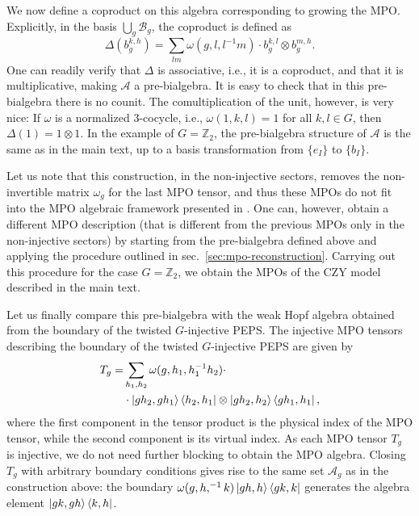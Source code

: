 \documentclass[prx, twocolumn, superscriptaddress, dvipsnames]{revtex4-2}
\theoremstyle{definition}
\newcommand{\mA}{\mathcal{A}}
\begin{document}
We now define a coproduct on this algebra corresponding to growing the MPO. Explicitly, in the basis $\bigcup_g\mathcal{B}_g$, the coproduct is defined as
\begin{equation}
    \Delta(b_g^{k,h}) = \sum_{lm} \omega(g,l,l^{-1}m) \cdot b_g^{k,l} \otimes b_g^{m,h}.
\end{equation}
One can readily verify that $\Delta$ is associative, i.e., it is a coproduct, and that it is multiplicative, making $\mathcal{A}$ a pre-bialgebra. It is easy to check that in this pre-bialgebra there is no counit. The comultiplication of the unit, however, is very nice: If $\omega$ is a normalized 3-cocycle, i.e., $\omega(1,k,l) = 1$ for all $k,l\in G$, then $\Delta(1) = 1\otimes 1$. In the example of $G=\mathbb{Z}_2$, the pre-bialgebra structure of $\mA$ is the same as in the main text, up to a basis transformation from $\{e_I\}$ to $\{b_I\}$. 

Let us note that this construction, in the non-injective sectors, removes the non-invertible matrix $\omega_g$ for the last MPO tensor, and thus these MPOs do not fit into the MPO algebraic framework presented in \cite{molnar2022matrix}. One can, however, obtain a different MPO description (that is different from the previous MPOs only in the non-injective sectors) by starting from the pre-bialgebra defined above and applying the procedure outlined in sec.~\ref{sec:mpo-reconstruction}. Carrying out this procedure for the case $G=\mathbb{Z}_2$, we obtain the MPOs of the CZY model described in the main text.

Let us finally compare this pre-bialgebra with the weak Hopf algebra obtained from the boundary of the twisted $G$-injective PEPS. The injective MPO tensors describing the boundary of the twisted $G$-injective PEPS are given by
\begin{equation*}
    \begin{aligned}
    T_g = &\sum_{h_1,h_2}  \omega(g,h_1, h_1^{-1}h_2) \cdot \\
    & \cdot \ket{gh_2, gh_1} \bra{h_2,h_1} \otimes \ket{gh_2, h_2}\bra{gh_1,h_1} ,  
    \end{aligned}
\end{equation*}
where the first component in the tensor product is the physical index of the MPO tensor, while the second component is its virtual index. As each MPO tensor $T_g$ is injective, we do not need further blocking to obtain the MPO algebra. Closing $T_g$ with arbitrary boundary conditions gives rise to the same set $\mA_g$ as in the construction above: the boundary $\omega(g,h,^{-1}k) \ket{gh,h}\bra{gk,k}$ generates the algebra element $\ket{gk,gh}\bra{k,h}$. 
\end{document}
